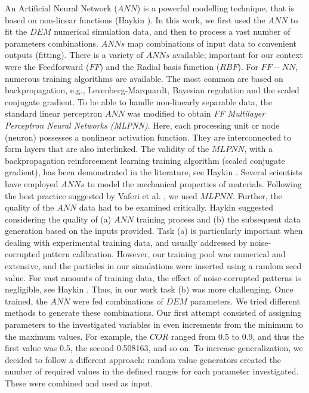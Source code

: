 \documentclass[review]{elsarticle}
\begin{document}
\begin{appendix}
An Artificial Neural Network ($ANN$) is a powerful modelling technique, 
that is based on non-linear functions (Haykin \cite{RefWorks:158}). 
In this work, we first used the $ANN$ to fit the $DEM$ numerical simulation
data, and then to process a vast number of parameters combinations. 
$ANNs$ map combinations of input data to convenient outputs (fitting). 
There is a variety of $ANNs$ available; important for our context were the
Feedforward ($FF$) and the Radial basis function ($RBF$). For $FF-NN$, 
numerous training algorithms are available. The most common are based on
backpropagation, e.g., Levenberg-Marquardt, Bayesian regulation and the scaled
conjugate gradient.
To be able to handle non-linearly separable data, the standard linear perceptron
$ANN$ was modified to obtain \textit{FF Multilayer Perceptron Neural Networks
(MLPNN)}.
Here, each processing unit or node (neuron) possesses a nonlinear activation function. 
They are interconnected to form layers that are also interlinked. 
The validity of the $MLPNN$, with a backpropagation reinforcement learning 
training algorithm (scaled conjugate gradient), has been demonstrated in the 
literature, see Haykin \cite{RefWorks:158}. Several scientists 
\cite{RefWorks:161, RefWorks:166, RefWorks:167, RefWorks:168, RefWorks:169,
RefWorks:170, RefWorks:178, RefWorks:179} have employed $ANNs$ to model
the mechanical properties of materials.
Following the best practice suggested by Vaferi et al. \cite{RefWorks:150}, we
used $MLPNN$.
Further, the quality of the $ANN$ data had to be examined critically. 
Haykin \cite{RefWorks:158} 
suggested considering the quality of (a) $ANN$ training process and (b) the
subsequent data generation based on the inputs provided.
Task (a) is particularly important
when dealing with experimental training data, and
usually addressed
by noise-corrupted pattern calibration.
However, our training pool was numerical and extensive, 
and the particles in our simulations were inserted using a random
seed value.
For vast amounts of training data, the effect of noise-corrupted patterns is
negligible, see Haykin \cite{RefWorks:158}.
Thus, in our work task (b) was more challenging.
Once trained, the $ANN$ were fed
combinations of $DEM$ parameters. 
We tried different methods to generate these combinations. 
Our first attempt consisted of assigning parameters to the investigated
variables in even increments from the minimum to the maximum values. 
For example, the $COR$ ranged from 0.5 to 0.9, and thus the first value was
0.5, the second 0.508163, and so on.
To increase generalization, we decided to follow a different approach: 
random value generators created the number of required values in the defined
ranges for each parameter investigated.
These were combined and used as input.\\


\end{appendix}
\end{document}
